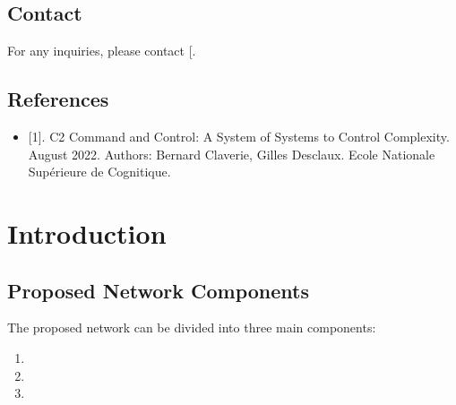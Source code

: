\documentclass[letterpaper,10pt,english]{sphinxmanual}
\begin{document}
\section{Contact}
\label{\detokenize{overview:contact}}
\sphinxAtStartPar
For any inquiries, please contact {[}\sphinxhref{mailto:info@sunair.com}{info@sunair.com}{]}.


\section{References}
\label{\detokenize{overview:references}}\begin{itemize}
\item {} 
\sphinxAtStartPar
{[}1{]}. C2 \sphinxhyphen{} Command and Control: A System of Systems to Control Complexity. August 2022. Authors: Bernard Claverie, Gilles Desclaux. Ecole Nationale Supérieure de Cognitique.

\end{itemize}

\sphinxstepscope


\chapter{Introduction}
\label{\detokenize{introduction:introduction}}\label{\detokenize{introduction::doc}}

\section{Proposed Network Components}
\label{\detokenize{introduction:proposed-network-components}}
\sphinxAtStartPar
The proposed network can be divided into three main components:
\begin{enumerate}
%
\item {} 
\sphinxAtStartPar
{}

\item {} 
\sphinxAtStartPar
{}

\item {} 
\sphinxAtStartPar
{}

\end{enumerate}
\end{document}
